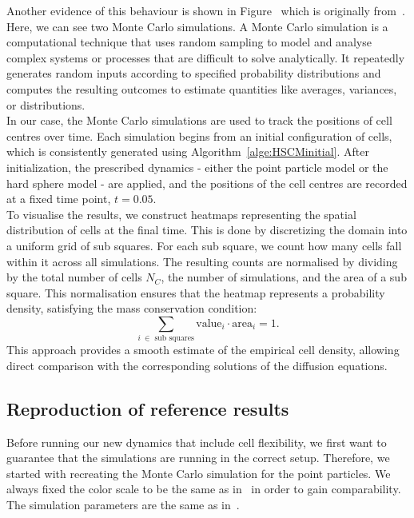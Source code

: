 Another evidence of this behaviour is shown in Figure~\cite{fig:fig2BC12} which is originally from~\cite{Bruna2012}. \\
Here, we can see two Monte Carlo simulations. 
A Monte Carlo simulation is a computational technique that uses random sampling to model and analyse complex systems or processes that are difficult to solve analytically. 
It repeatedly generates random inputs according to specified probability distributions and computes the resulting outcomes to estimate quantities like averages, variances, or distributions. \\
In our case, the Monte Carlo simulations are used to track the positions of cell centres over time. 
Each simulation begins from an initial configuration of cells, which is consistently generated using Algorithm~\ref{alge:HSCMinitial}. 
After initialization, the prescribed dynamics - either the point particle model or the hard sphere model - are applied, and the positions of the cell centres are recorded at a fixed time point, $t=0.05$. \\
To visualise the results, we construct heatmaps representing the spatial distribution of cells at the final time. 
This is done by discretizing the domain into a uniform grid of sub squares. 
For each sub square, we count how many cells fall within it across all simulations. 
The resulting counts are normalised by dividing by the total number of cells $N_C$, the number of simulations, and the area of a sub square. This normalisation ensures that the heatmap represents a probability density, satisfying the mass conservation condition: \[\sum\limits_{i \: \in \text{ sub squares}} \text{value}_i \cdot \text{area}_i = 1. \]
This approach provides a smooth estimate of the empirical cell density, allowing direct comparison with the corresponding solutions of the diffusion equations.


\subsection{Reproduction of reference results}
Before running our new dynamics that include cell flexibility, we first want to guarantee that the simulations are running in the correct setup.
Therefore, we started with recreating the Monte Carlo simulation for the point particles. 
We always fixed the color scale to be the same as in~\cite{Bruna2012} in order to gain comparability. 
The simulation parameters are the same as in~\cite{Bruna2012}. \\


